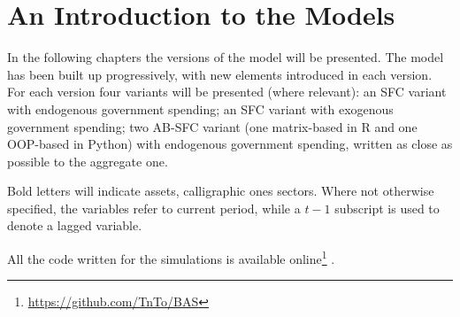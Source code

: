 \chapter{An Introduction to the Models}
In the following chapters the versions of the model will be presented.
The model has been built up progressively, with new elements introduced in each version.
For each version four variants will be presented (where relevant): an SFC variant with endogenous government spending; an SFC variant with exogenous government spending; two AB-SFC variant (one matrix-based in R and one OOP-based in Python) with endogenous government spending, written as close as possible to the aggregate one.

Bold letters will indicate assets, calligraphic ones sectors.
Where not otherwise specified, the variables refer to current period, while a ${t-1}$ subscript is used to denote a lagged variable.

All the code written for the simulations is available online\footnote{\url{https://github.com/TnTo/BAS}}%
.
